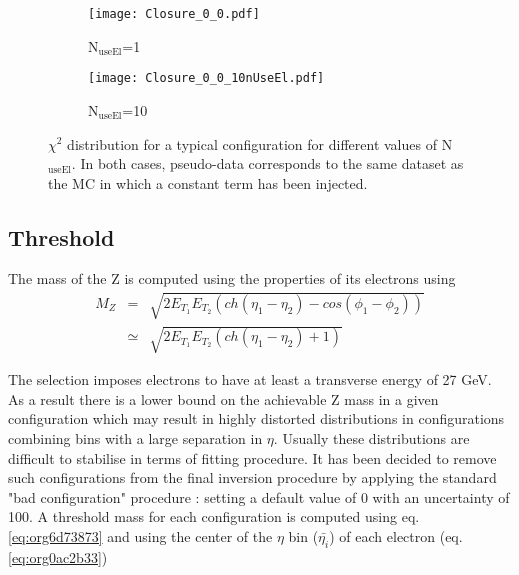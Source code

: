 \begin{figure}
\begin{subfigure}[t]{0.49\linewidth}
\begin{center}
\texttt{[image: Closure\_0\_0.pdf]}
\end{center}
\caption{N\(_{\text{useEl}}\)=1}
\end{subfigure}
\begin{subfigure}[t]{0.49\linewidth}
\begin{center}
\texttt{[image: Closure\_0\_0\_10nUseEl.pdf]}
\end{center}
\caption{N\(_{\text{useEl}}\)=10}
\end{subfigure}
\caption{\label{org98e07ca}
$\chi^2$ distribution for a typical configuration for different values of N\(_{\text{useEl}}\). In both cases, pseudo-data corresponds to the same dataset as the MC in which a constant term has been injected.}
\end{figure}


\subsection{Threshold}
\label{sec:org899f075}

The mass of the Z is computed using the properties of its electrons using
\begin{equation}
  \label{eq:org6d73873}
  \begin{array}{lcl}
    M_Z &=& \sqrt{2E_{T_1}E_{T_2}(ch(\eta_1-\eta_2) - cos(\phi_1-\phi_2) )} \\
            &\simeq &\sqrt{2E_{T_1}E_{T_2}(ch(\eta_1-\eta_2) +1 )}
    \end{array}
\end{equation}

The selection imposes electrons to have at least a transverse energy of 27 GeV.
As a result there is a lower bound on the achievable Z mass in a given configuration which may result in highly distorted distributions in configurations combining bins with a large separation in $\eta$.
Usually these distributions are difficult to stabilise in terms of fitting procedure.
It has been decided to remove such configurations from the final inversion procedure by applying the standard "bad configuration" procedure : setting a default value of 0 with an uncertainty of 100.
A threshold mass for each configuration is computed using eq. \ref{eq:org6d73873} and using the center of the $\eta$ bin (\(\bar{\eta_i}\)) of each electron (eq. \ref{eq:org0ac2b33})

